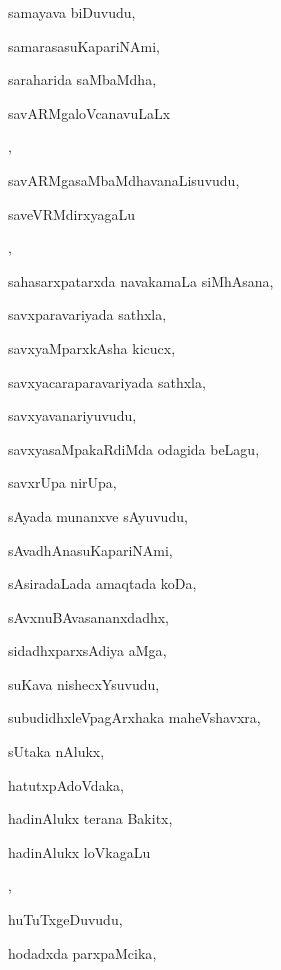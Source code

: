 \begin{multicols}{3}
{\noindent
{samayava biDuvudu}, \pageref{samayava biDuvudu}

\noindent
{samarasasuKapariNAmi}, \pageref{samarasasuKapariNAmi}

\noindent
{saraharida saMbaMdha}, \pageref{saraharida saMbaMdha}

\noindent
{savARMgaloVcanavuLaLx} 

\noindent
{}, \pageref{savARMgaloVcanavuLaLx jaMgama}

\noindent
{savARMgasaMbaMdhavanaLisuvudu}, \pageref{savARMgasaMbaMdhavanaLisuvudu}

\noindent
{saveVRMdirxyagaLu}

\noindent
{}, \pageref{saveVRMdirxyagaLu EkeVMdirxyavAguvudu}

\noindent
{sahasarxpatarxda navakamaLa siMhAsana}, \pageref{sahasarxpatarxda navakamaLa siMhAsana}

\noindent
{savxparavariyada sathxla}, \pageref{savxparavariyada sathxla}

\noindent
{savxyaMparxkAsha kicucx}, \pageref{savxyaMparxkAsha kicucx}

\noindent
{savxyacaraparavariyada sathxla}, \pageref{savxyacaraparavariyada sathxla}

\noindent
{savxyavanariyuvudu}, \pageref{savxyavanariyuvudu}

\noindent
{savxyasaMpakaRdiMda odagida beLagu}, \pageref{savxyasaMpakaRdiMda odagida beLagu}

\noindent
{savxrUpa nirUpa}, \pageref{savxrUpa nirUpa}

\noindent
{sAyada munanxve sAyuvudu}, \pageref{sAyada munanxve sAyuvudu}

\noindent
{sAvadhAnasuKapariNAmi}, \pageref{sAvadhAnasuKapariNAmi}

\noindent
{sAsiradaLada amaqtada koDa}, \pageref{sAsiradaLada amaqtada koDa}

\noindent
{sAvxnuBAvasananxdadhx}, \pageref{sAvxnuBAvasananxdadhx}

\noindent
{sidadhxparxsAdiya aMga}, \pageref{sidadhxparxsAdiya aMga}

\noindent
{suKava nishecxYsuvudu}, \pageref{suKava nishecxYsuvudu}

\noindent
{subudidhxleVpagArxhaka maheVshavxra}, \pageref{subudidhxleVpagArxhaka maheVshavxra}

\noindent
{sUtaka nAlukx}, \pageref{sUtaka nAlukx}

\noindent
{hatutxpAdoVdaka}, \pageref{hatutxpAdoVdaka}

\noindent
{hadinAlukx terana Bakitx}, \pageref{hadinAlukx terana Bakitx}

\noindent
{hadinAlukx loVkagaLu} 

\noindent
{}, \pageref{hadinAlukx loVkagaLu (IreVLu loVka)}

\noindent
{huTuTxgeDuvudu}, \pageref{huTuTxgeDuvudu}

\noindent
{hodadxda parxpaMcika}, \pageref{hodadxda parxpaMcika}
}
\end{multicols}

